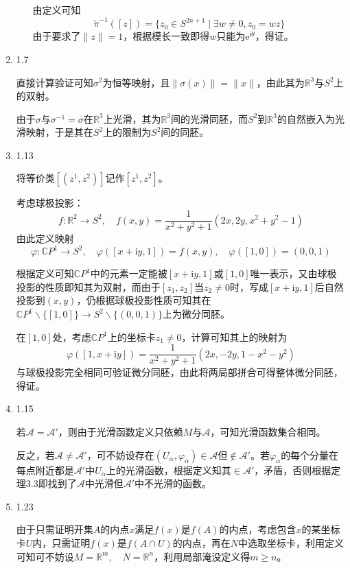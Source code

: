 \documentclass[a4paper,UTF8,fontset=windows,10pt]{ctexart}
\newcommand*{\bc}{\mathbb{C}}
\begin{document}
\begin{enumerate}
\begin{enumerate}[(1)]
        由定义可知
        $$\tilde\pi^{-1}([z])=\{z_0\in S^{2n+1}\mid \exists w\ne 0,z_0=wz\}$$
        由于要求了$\|z\|=1$，根据模长一致即得$w$只能为$\mathrm{e}^{\mathrm{i}\theta}$，得证。
    
    \end{enumerate}
    
    \item 1.7
    
    直接计算验证可知$\sigma^2$为恒等映射，且$\|\sigma(x)\|=\|x\|$，由此其为$\mathbb{R}^3$与$S^2$上的双射。
    
    由于$\sigma$与$\sigma^{-1}=\sigma$在$\mathbb{R}^3$上光滑，其为$\mathbb{R}^3$间的光滑同胚，而$S^2$到$\mathbb{R}^3$的自然嵌入为光滑映射，于是其在$S^2$上的限制为$S^2$间的同胚。
    
    \item 1.13
    
    将等价类$[(z^1,z^2)]$记作$[z^1,z^2]$。
    
    考虑球极投影：
    $$f:\mathbb{R}^2\to S^2,\quad f(x,y)=\frac{1}{x^2+y^2+1}(2x,2y,x^2+y^2-1)$$
    由此定义映射
    $$\varphi:\bc P^1\to S^2,\quad \varphi([x+\mathrm{i}y,1])=f(x,y),\quad\varphi([1,0])=(0,0,1)$$
    
    根据定义可知$\bc P^1$中的元素一定能被$[x+\mathrm{i}y,1]$或$[1,0]$唯一表示，又由球极投影的性质即知其为双射，而由于$[z_1,z_2]$当$z_2\ne0$时，写成$[x+\mathrm{i}y,1]$后自然投影到$(x,y)$，仍根据球极投影性质可知其在$\bc P^1\backslash\{[1,0]\}\to S^2\backslash\{(0,0,1)\}$上为微分同胚。
    
    在$[1,0]$处，考虑$\bc P^1$上的坐标卡$z_1\ne 0$，计算可知其上的映射为
    $$\varphi([1,x+\mathrm{i}y])=\frac{1}{x^2+y^2+1}(2x,-2y,1-x^2-y^2)$$
    与球极投影完全相同可验证微分同胚，由此将两局部拼合可得整体微分同胚，得证。
    
    \item 1.15
    
    若$\mathcal{A}=\mathcal{A}'$，则由于光滑函数定义只依赖$M$与$\mathcal{A}$，可知光滑函数集合相同。
    
    反之，若$\mathcal{A}\ne\mathcal{A}'$，可不妨设存在$(U_\alpha,\varphi_\alpha)\in\mathcal{A}$但$\notin\mathcal{A}'$。若$\varphi_\alpha$的每个分量在每点附近都是$\mathcal{A}'$中$U_\alpha$上的光滑函数，根据定义知其$\in\mathcal{A}'$，矛盾，否则根据定理3.3即找到了$\mathcal{A}$中光滑但$\mathcal{A}'$中不光滑的函数。
    
    \item 1.23
    
    由于只需证明开集$A$的内点$x$满足$f(x)$是$f(A)$的内点，考虑包含$x$的某坐标卡$U$内，只需证明$f(x)$是$f(A\cap U)$的内点，再在$N$中选取坐标卡，利用定义可知可不妨设$M=\mathbb{R}^m,\quad N=\mathbb{R}^n$，利用局部淹没定义得$m\ge n$。
    

\end{enumerate}
\end{document}
